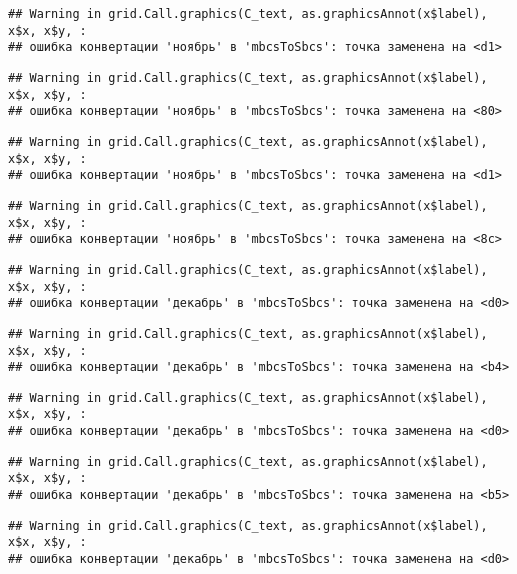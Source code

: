 \documentclass[
]{article}
\begin{document}
\begin{verbatim}
## Warning in grid.Call.graphics(C_text, as.graphicsAnnot(x$label), x$x, x$y, :
## ошибка конвертации 'ноябрь' в 'mbcsToSbcs': точка заменена на <d1>
\end{verbatim}

\begin{verbatim}
## Warning in grid.Call.graphics(C_text, as.graphicsAnnot(x$label), x$x, x$y, :
## ошибка конвертации 'ноябрь' в 'mbcsToSbcs': точка заменена на <80>
\end{verbatim}

\begin{verbatim}
## Warning in grid.Call.graphics(C_text, as.graphicsAnnot(x$label), x$x, x$y, :
## ошибка конвертации 'ноябрь' в 'mbcsToSbcs': точка заменена на <d1>
\end{verbatim}

\begin{verbatim}
## Warning in grid.Call.graphics(C_text, as.graphicsAnnot(x$label), x$x, x$y, :
## ошибка конвертации 'ноябрь' в 'mbcsToSbcs': точка заменена на <8c>
\end{verbatim}

\begin{verbatim}
## Warning in grid.Call.graphics(C_text, as.graphicsAnnot(x$label), x$x, x$y, :
## ошибка конвертации 'декабрь' в 'mbcsToSbcs': точка заменена на <d0>
\end{verbatim}

\begin{verbatim}
## Warning in grid.Call.graphics(C_text, as.graphicsAnnot(x$label), x$x, x$y, :
## ошибка конвертации 'декабрь' в 'mbcsToSbcs': точка заменена на <b4>
\end{verbatim}

\begin{verbatim}
## Warning in grid.Call.graphics(C_text, as.graphicsAnnot(x$label), x$x, x$y, :
## ошибка конвертации 'декабрь' в 'mbcsToSbcs': точка заменена на <d0>
\end{verbatim}

\begin{verbatim}
## Warning in grid.Call.graphics(C_text, as.graphicsAnnot(x$label), x$x, x$y, :
## ошибка конвертации 'декабрь' в 'mbcsToSbcs': точка заменена на <b5>
\end{verbatim}

\begin{verbatim}
## Warning in grid.Call.graphics(C_text, as.graphicsAnnot(x$label), x$x, x$y, :
## ошибка конвертации 'декабрь' в 'mbcsToSbcs': точка заменена на <d0>
\end{verbatim}
\end{document}
